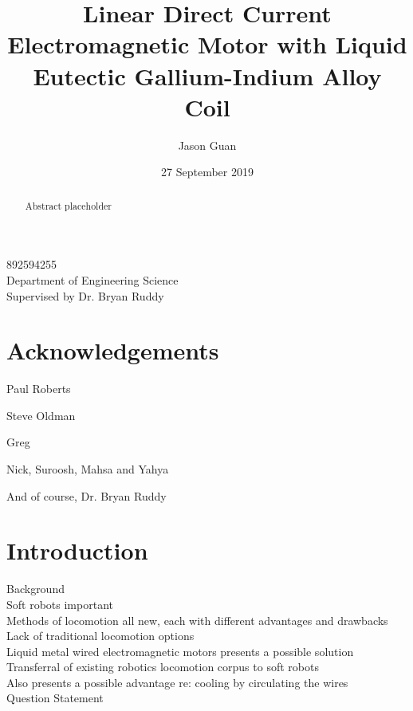 \documentclass[a4paper,12pt]{article}
\title{Linear Direct Current Electromagnetic Motor with Liquid Eutectic Gallium-Indium Alloy Coil}
\author{Jason Guan}
\date{27 September 2019}
\begin{document}
\maketitle
\begin{center}
	892594255\\
	Department of Engineering Science\\
	Supervised by Dr. Bryan Ruddy
\end{center}

\newpage

\begin{abstract}
Abstract placeholder
\end{abstract}

\newpage

\section*{Acknowledgements}
Paul Roberts 

Steve Oldman 

Greg  

Nick, Suroosh, Mahsa and Yahya 

And of course, Dr. Bryan Ruddy 

\newpage

\tableofcontents

\newpage

\section{Introduction}
Background\\

Soft robots important \\

Methods of locomotion all new, each with different advantages and drawbacks \\

Lack of traditional locomotion options \\

Liquid metal wired electromagnetic motors presents a possible solution \\

Transferral of existing robotics locomotion corpus to soft robots \\

Also presents a possible advantage re: cooling by circulating the wires \\

Question Statement \\
\end{document}
